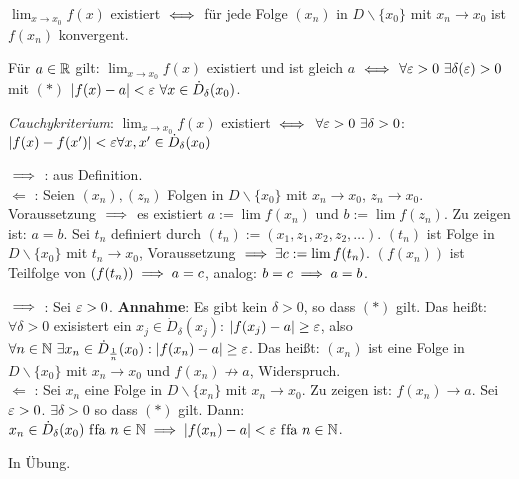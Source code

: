 \documentclass[a4paper,oneside,DIV15,BCOR12mm]{scrbook}
\begin{document}
\begin{satz}
\begin{liste}
\item $\displaystyle\lim_{x\to x_0}f(x)$ existiert $\iff$ für jede Folge $(x_n)$ in $D\backslash\{x_0\}$ mit $x_n \to x_0$ ist $f(x_n)$ konvergent.
\item Für $a\in\mathbb{R}$ gilt: $\displaystyle\lim_{x\to x_0}f(x)$ existiert und ist gleich $a$ $\iff$ $\forall \varepsilon>0 \ \exists \delta(\varepsilon) > 0$ mit $(*)$ $|f(x) - a|< \varepsilon \ \forall x \in \dot D_\delta(x_0)$. 
\item \textit{Cauchykriterium}: $\displaystyle\lim_{x\to x_0} f(x)$ existiert $\iff$ $\forall \varepsilon>0 \ \exists \delta >0$: $|f(x) - f(x')|<\varepsilon \forall x,x' \in \dot D_\delta(x_0)$
\end{liste}
\end{satz}

\begin{beweise}
\item \glqq $\implies$ \grqq: aus Definition. \\
\glqq $\Leftarrow$ \grqq: Seien $(x_n), (z_n)$ Folgen in $D\backslash\{x_0\}$ mit $x_n \to x_0$, $z_n \to x_0$. Voraussetzung $\implies$ es existiert $a := \lim f(x_n)$ und $b := \lim f(z_n)$. Zu zeigen ist: $a=b$. Sei $t_n$ definiert durch $(t_n) := (x_1,z_1,x_2,z_2,\ldots)$. $(t_n)$ ist Folge in $D \backslash\{x_0\}$ mit $t_n\to x_0$, Voraussetzung $\implies  \exists c := \lim f(t_n)$. $(f(x_n))$ ist Teilfolge von $(f(t_n)) \implies a=c$, analog: $b=c \implies a = b$.
\item \glqq $\implies$ \grqq: Sei $\varepsilon > 0$. \textbf{Annahme}: Es gibt kein $\delta > 0$, so dass $(*)$ gilt. Das heißt: $\forall \delta > 0$ exisistert ein $x_j \in \dot D_\delta(x_j)$: $|f(x_j) - a| \ge \varepsilon$, also $\forall n\in\mathbb{N} \ \exists x_n \in \dot D_{\frac{1}{n}}(x_0): |f(x_n) - a|\ge\varepsilon$. Das heißt: $(x_n)$ ist eine Folge in $D \backslash\{x_0\}$ mit $x_n \to x_0$ und $f(x_n) \nrightarrow a$, Widerspruch. \\
\glqq $\Leftarrow$ \grqq: Sei $x_n$ eine Folge in $D \backslash\{x_n\}$ mit $x_n \to x_0$. Zu zeigen ist: $f(x_n) \to a$. Sei $\varepsilon>0$. $\exists \delta > 0$ so dass $(*)$ gilt. Dann: $x_n \in \dot D_\delta(x_0) \text{ f\/fa } n\in\mathbb{N} \implies |f(x_n) - a| < \varepsilon \text{ f\/fa } n\in\mathbb{N}$.
\item In Übung.
\end{beweise}
\end{document}
